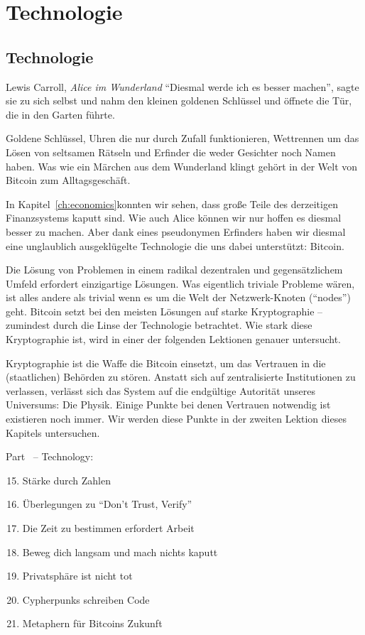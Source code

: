 \part{Technologie}
\label{ch:technology}
\chapter*{Technologie}

\begin{chapquote}{Lewis Carroll, \textit{Alice im Wunderland}}
\enquote{Diesmal werde ich es besser machen}, sagte sie zu sich selbst und nahm
den kleinen goldenen Schlüssel und öffnete die Tür, die in den Garten führte.
\end{chapquote}

Goldene Schlüssel, Uhren die nur durch Zufall funktionieren, Wettrennen um das
Lösen von seltsamen Rätseln und Erfinder die weder Gesichter noch Namen haben.
Was wie ein Märchen aus dem Wunderland klingt gehört in der Welt von Bitcoin zum
Alltagsgeschäft.

In Kapitel~\ref{ch:economics}konnten wir sehen, dass große Teile des derzeitigen
Finanzsystems kaputt sind. Wie auch Alice können wir nur hoffen es diesmal
besser zu machen. Aber dank eines pseudonymen Erfinders haben wir diesmal eine
unglaublich ausgeklügelte Technologie die uns dabei unterstützt: Bitcoin.

Die Lösung von Problemen in einem radikal dezentralen und gegensätzlichem Umfeld
erfordert einzigartige Lösungen. Was eigentlich triviale Probleme wären, ist
alles andere als trivial wenn es um die Welt der Netzwerk-Knoten (“nodes”) geht.
Bitcoin setzt bei den meisten Lösungen auf starke Kryptographie – zumindest
durch die Linse der Technologie betrachtet. Wie stark diese Kryptographie ist,
wird in einer der folgenden Lektionen genauer untersucht.

Kryptographie ist die Waffe die Bitcoin einsetzt, um das Vertrauen in die
(staatlichen) Behörden zu stören. Anstatt sich auf zentralisierte Institutionen
zu verlassen, verlässt sich das System auf die endgültige Autorität unseres
Universums: Die Physik. Einige Punkte bei denen Vertrauen notwendig ist
existieren noch immer. Wir werden diese Punkte in der zweiten Lektion dieses
Kapitels untersuchen.
~

\begin{samepage}
Part~\ref{ch:technology} -- Technology:

\begin{enumerate}
  \setcounter{enumi}{14}
  \item Stärke durch Zahlen
  \item Überlegungen zu \enquote{Don't Trust, Verify}
  \item Die Zeit zu bestimmen erfordert Arbeit
  \item Beweg dich langsam und mach nichts kaputt
  \item Privatsphäre ist nicht tot
  \item Cypherpunks schreiben Code
  \item Metaphern für Bitcoins Zukunft
\end{enumerate}
\end{samepage}

